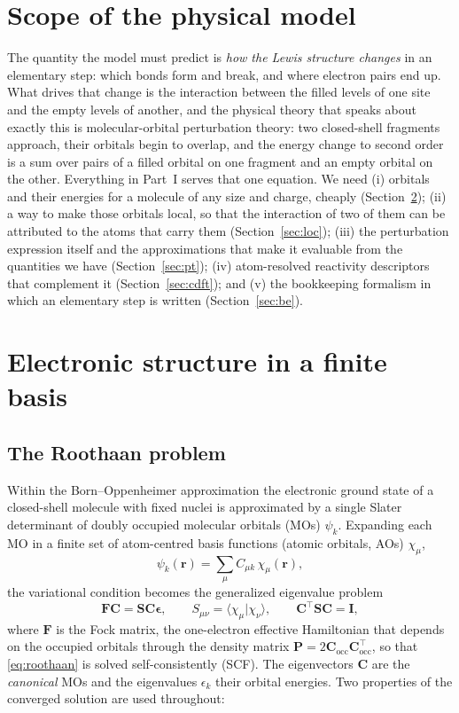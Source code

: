 \documentclass[11pt,a4paper]{article}
\newcommand{\occ}{\mathrm{occ}}
\newcommand{\vb}[1]{\bm{#1}}
\begin{document}
\section{Scope of the physical model}
\label{sec:scope}
The quantity the model must predict is \emph{how the Lewis structure changes} in an elementary step: which bonds form and break, and where electron pairs end up. What drives that change is the interaction between the filled levels of one site and the empty levels of another, and the physical theory that speaks about exactly this is molecular-orbital perturbation theory: two closed-shell fragments approach, their orbitals begin to overlap, and the energy change to second order is a sum over pairs of a filled orbital on one fragment and an empty orbital on the other. Everything in Part~I serves that one equation. We need (i) orbitals and their energies for a molecule of any size and charge, cheaply (Section~\ref{sec:es}); (ii) a way to make those orbitals local, so that the interaction of two of them can be attributed to the atoms that carry them (Section~\ref{sec:loc}); (iii) the perturbation expression itself and the approximations that make it evaluable from the quantities we have (Section~\ref{sec:pt}); (iv) atom-resolved reactivity descriptors that complement it (Section~\ref{sec:cdft}); and (v) the bookkeeping formalism in which an elementary step is written (Section~\ref{sec:be}).

\section{Electronic structure in a finite basis}
\label{sec:es}

\subsection{The Roothaan problem}
Within the Born--Oppenheimer approximation the electronic ground state of a closed-shell molecule with fixed nuclei is approximated by a single Slater determinant of doubly occupied molecular orbitals (MOs) $\psi_k$. Expanding each MO in a finite set of atom-centred basis functions (atomic orbitals, AOs) $\chi_\mu$,
\begin{equation}
\psi_k(\vb{r})=\sum_{\mu} C_{\mu k}\,\chi_\mu(\vb{r}),
\end{equation}
the variational condition becomes the generalized eigenvalue problem
\begin{equation}
\vb{F}\vb{C}=\vb{S}\vb{C}\vb{\epsilon},\qquad S_{\mu\nu}=\langle\chi_\mu|\chi_\nu\rangle,\qquad \vb{C}^{\!\top}\vb{S}\vb{C}=\vb{I},
\label{eq:roothaan}
\end{equation}
where $\vb{F}$ is the Fock matrix, the one-electron effective Hamiltonian that depends on the occupied orbitals through the density matrix $\vb{P}=2\vb{C}_{\occ}\vb{C}_{\occ}^{\!\top}$, so that \eqref{eq:roothaan} is solved self-consistently (SCF). The eigenvectors $\vb{C}$ are the \emph{canonical} MOs and the eigenvalues $\epsilon_k$ their orbital energies. Two properties of the converged solution are used throughout:
\end{document}
